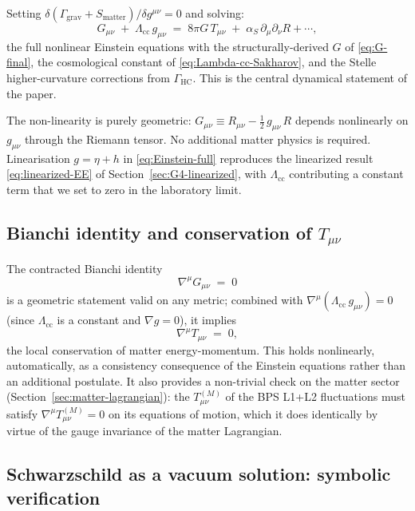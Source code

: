 \documentclass[11pt]{article}
\begin{document}
Setting $\delta(\Gamma_{\mathrm{grav}} + S_{\mathrm{matter}})/\delta g^{\mu\nu}
= 0$ and solving:
\begin{equation}
  \boxed{\;
    G_{\mu\nu}
     \;+\;
     \Lambda_{\mathrm{cc}}\,g_{\mu\nu}
     \;=\;
     8\pi G\,T_{\mu\nu}
     \;+\;
     \alpha_S\,\partial_\mu\partial_\nu R + \cdots,
  \;}
  \label{eq:Einstein-full}
\end{equation}
the full nonlinear Einstein equations with the
structurally-derived $G$ of \eqref{eq:G-final}, the cosmological
constant of \eqref{eq:Lambda-cc-Sakharov}, and the Stelle
higher-curvature corrections from $\Gamma_{\mathrm{HC}}$.  This is
the central dynamical statement of the paper.

The non-linearity is purely geometric: $G_{\mu\nu} \equiv R_{\mu\nu}
- \tfrac{1}{2}\,g_{\mu\nu}\,R$ depends nonlinearly on $g_{\mu\nu}$
through the Riemann tensor.  No additional matter physics is
required.  Linearisation $g = \eta + h$ in
\eqref{eq:Einstein-full} reproduces the linearized result
\eqref{eq:linearized-EE} of Section~\ref{sec:G4-linearized}, with
$\Lambda_{\mathrm{cc}}$ contributing a constant term that we set
to zero in the laboratory limit.

\subsection{Bianchi identity and conservation of $T_{\mu\nu}$}

The contracted Bianchi identity
\begin{equation}
  \nabla^\mu G_{\mu\nu} \;=\; 0
\end{equation}
is a geometric statement valid on any metric; combined with
$\nabla^\mu(\Lambda_{\mathrm{cc}}\,g_{\mu\nu}) = 0$ (since
$\Lambda_{\mathrm{cc}}$ is a constant and $\nabla g = 0$), it
implies
\begin{equation}
  \nabla^\mu T_{\mu\nu} \;=\; 0,
\end{equation}
the local conservation of matter energy-momentum.  This holds
nonlinearly, automatically, as a consistency consequence of the
Einstein equations rather than an additional postulate.  It also
provides a non-trivial check on the matter sector
(Section~\ref{sec:matter-lagrangian}): the $T^{(M)}_{\mu\nu}$ of
the BPS L1+L2 fluctuations must satisfy $\nabla^\mu
T^{(M)}_{\mu\nu} = 0$ on its equations of motion, which it does
identically by virtue of the gauge invariance of the matter
Lagrangian.

\subsection{Schwarzschild as a vacuum solution: symbolic
verification}
\end{document}
